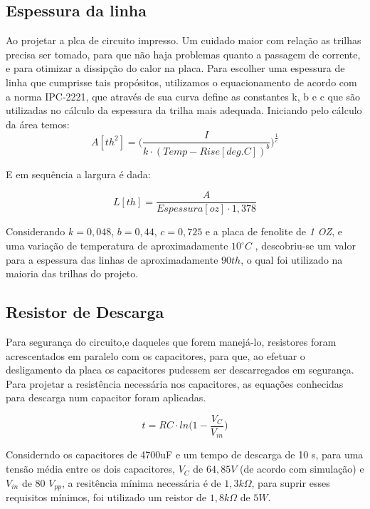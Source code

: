 \documentclass[a4paper,12pt,oneside,openany,table,xcdraw]{article}
\begin{document}
\subsection{Espessura da linha}

Ao projetar a plca de circuito impresso. Um cuidado maior com relação as trilhas precisa ser tomado, para que não haja problemas quanto a passagem de corrente, e para otimizar a dissipção do calor na placa. 
Para escolher uma espessura de linha que cumprisse tais propósitos, utilizamos o equacionamento de acordo com a norma IPC-2221, que através de sua curva define as constantes k, b e c que são utilizadas no cálculo da espessura da trilha mais adequada.
Iniciando pelo cálculo da área temos:
\begin{equation}
A [\mathit{th^{2}}] = \Bigg(\dfrac{I}{k \cdot (Temp-Rise [deg. C])^{b}}\Bigg)^{\frac{1}{c}}
 \end{equation}
 \vspace{0.3cm}

E em sequência a largura é dada:

\begin{equation}
L [\mathit{th}] = \dfrac{A}{Espessura [oz] \cdot 1,378}
 \end{equation}
\vspace{0.3cm}

Considerando  $k = 0,048$, $b = 0,44$, $c = 0,725$ e a placa de fenolite de \emph{1 OZ}, e uma variação de temperatura de aproximadamente $10^{\circ}C$ , descobriu-se um valor para a espessura das linhas de aproximadamente $90 th$, o qual foi utilizado na maioria das trilhas do projeto.


\subsection{Resistor de Descarga} \label{descarga}

Para segurança do circuito,e daqueles que forem manejá-lo, resistores foram acrescentados em paralelo com os capacitores, para que, ao efetuar o desligamento da placa os capacitores pudessem ser descarregados em segurança.
Para projetar a resistência necessária nos capacitores, as equações conhecidas para descarga num capacitor foram aplicadas.

\begin{equation}
t= RC \cdot ln\bigg( 1 - \frac{V_{C}}{V_{in}} \bigg) 
\end{equation}

Considerndo os capacitores de 4700uF e um tempo de descarga de 10 s, para uma tensão média entre os dois capacitores, $V_{C}$ de $64,85 V$ (de acordo com simulação) e $V_{in}$ de 80 $V_{pp}$, a resitência mínima necessária é de $1,3 k\Omega$, para suprir esses requisitos mínimos, foi utilizado um reistor de $1,8 k\Omega$ de $5W$. 
\end{document}
